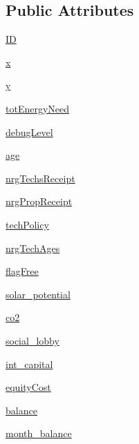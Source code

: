 \subsection*{Public Attributes}
\begin{DoxyCompactItemize}
\item 
\hyperlink{classagents_1_1agents_ab49a8a4040dae5277e8362b1ae4fc852}{I\-D}
\item 
\hyperlink{classagents_1_1agents_acbaa129398441280f50a0336800999fb}{x}
\item 
\hyperlink{classagents_1_1agents_a680f80df9607786b2bc5e48946241b2c}{y}
\item 
\hyperlink{classagents_1_1agents_ab3164810ca5ac60bf7b13256f942383e}{tot\-Energy\-Need}
\item 
\hyperlink{classagents_1_1agents_a403d7f599fec220c9d9d566fc6eb6809}{debug\-Level}
\item 
\hyperlink{classagents_1_1agents_a53209722a59cdca5994b5e9fe7a5f552}{age}
\item 
\hyperlink{classagents_1_1agents_aabee9e2293108f91ecd56018a7bcba71}{nrg\-Techs\-Receipt}
\item 
\hyperlink{classagents_1_1agents_a04cce6767e7415696341f025893f7527}{nrg\-Prop\-Receipt}
\item 
\hyperlink{classagents_1_1agents_afa32a8451941d2277f7d8a35ce84e8ce}{tech\-Policy}
\item 
\hyperlink{classagents_1_1agents_abaed438ff4d556adf4037555798d6e65}{nrg\-Tech\-Ages}
\item 
\hyperlink{classagents_1_1agents_ad3f61cae02b3bb1ac3b5ba73180f801b}{flag\-Free}
\item 
\hyperlink{classagents_1_1agents_a10090b4e6bff23388c3cdb69c442af9c}{solar\-\_\-potential}
\item 
\hyperlink{classagents_1_1agents_a167134f52dea83bf9e2006a465579d52}{co2}
\item 
\hyperlink{classagents_1_1agents_aed0d5fe7ba03ee22359c9d0527f33ba3}{social\-\_\-lobby}
\item 
\hyperlink{classagents_1_1agents_af2c64fcd26cbbd019ac4111df70846f7}{int\-\_\-capital}
\item 
\hyperlink{classagents_1_1agents_ab82930e2856732ce318a3a16292a3500}{equity\-Cost}
\item 
\hyperlink{classagents_1_1agents_a578158bdb5867e9fc644a312577b1a4f}{balance}
\item 
\hyperlink{classagents_1_1agents_af19d716ed68371eb31290d813209bb77}{month\-\_\-balance}
\item 

\end{DoxyCompactItemize}
